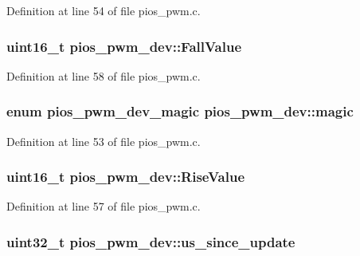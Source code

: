 \-Definition at line 54 of file pios\-\_\-pwm.\-c.

\hypertarget{structpios__pwm__dev_ad3484d9d98fd9b11c7abca2cdd9c9ee0}{
\subsubsection[{\-Fall\-Value}]{\setlength{\rightskip}{0pt plus 5cm}uint16\-\_\-t {\bf pios\-\_\-pwm\-\_\-dev\-::\-Fall\-Value}}}\label{structpios__pwm__dev_ad3484d9d98fd9b11c7abca2cdd9c9ee0}


\-Definition at line 58 of file pios\-\_\-pwm.\-c.

\hypertarget{structpios__pwm__dev_a30184bc599b287648e5b2430590a2057}{
\subsubsection[{magic}]{\setlength{\rightskip}{0pt plus 5cm}enum {\bf pios\-\_\-pwm\-\_\-dev\-\_\-magic} {\bf pios\-\_\-pwm\-\_\-dev\-::magic}}}\label{structpios__pwm__dev_a30184bc599b287648e5b2430590a2057}


\-Definition at line 53 of file pios\-\_\-pwm.\-c.

\hypertarget{structpios__pwm__dev_ab54467e66397e1470fcda91714768c18}{
\subsubsection[{\-Rise\-Value}]{\setlength{\rightskip}{0pt plus 5cm}uint16\-\_\-t {\bf pios\-\_\-pwm\-\_\-dev\-::\-Rise\-Value}}}\label{structpios__pwm__dev_ab54467e66397e1470fcda91714768c18}


\-Definition at line 57 of file pios\-\_\-pwm.\-c.

\hypertarget{structpios__pwm__dev_a7a992a8b90e3ff0cfa62b69a5157e34e}{
\subsubsection[{us\-\_\-since\-\_\-update}]{\setlength{\rightskip}{0pt plus 5cm}uint32\-\_\-t {\bf pios\-\_\-pwm\-\_\-dev\-::us\-\_\-since\-\_\-update}}}\label{structpios__pwm__dev_a7a992a8b90e3ff0cfa62b69a5157e34e}


